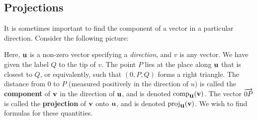 \subsection{Projections}\label{ssec:projections}

It is sometimes important to find the component of a vector in a
particular direction. Consider the following picture:
\begin{center}
\end{center}
Here, $\mbox{\bf u}$ is a non-zero vector specifying a {\em direction},
and $v$ is any vector. We have given the label $Q$ to the tip of
$v$. The point $P$ lies at the place along $\mbox{\bf u}$ that is closest
to $Q$, or equivalently, such that $(0,P,Q)$ forms a right
triangle. The distance from $0$ to $P$ (measured positively in the
direction of $u$) is called the
\textbf{component} of
$\mbox{\bf v}$ in the direction of $\mbox{\bf u}$, and is denoted
$\mbox{\rm comp}_{\mbox{\bf u}}(\mbox{\bf v})$. The vector $\overrightarrow{0P}$ is
called the
\textbf{projection} of
$\mbox{\bf v}$ onto $\mbox{\bf u}$, and is denoted
$\mbox{\rm proj}_{\mbox{\bf u}}(\mbox{\bf v})$. We wish to find formulas for these
quantities.

